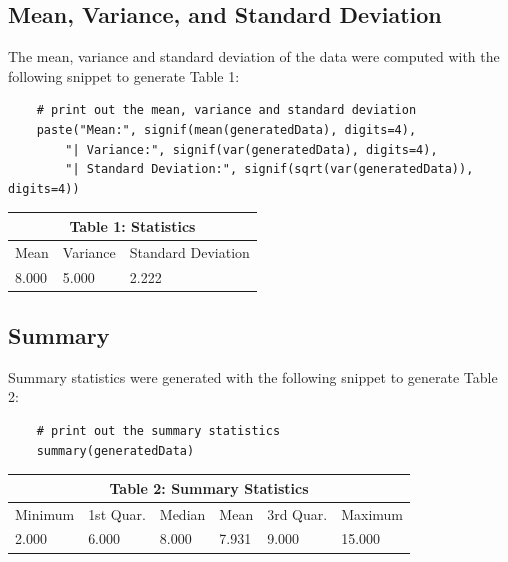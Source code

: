 \documentclass{article}
\begin{document}
        \subsection{Mean, Variance, and Standard Deviation}
            The mean, variance and standard deviation of the data were computed with the following snippet to generate Table 1:
\begin{lstlisting}
    # print out the mean, variance and standard deviation
    paste("Mean:", signif(mean(generatedData), digits=4),
        "| Variance:", signif(var(generatedData), digits=4),
        "| Standard Deviation:", signif(sqrt(var(generatedData)), digits=4))
\end{lstlisting}

        \renewcommand{\arraystretch}{1.5}
        \setlength{\tabcolsep}{18pt}
        \begin{table}[h!]
            \centering
            \begin{tabular}{|p{3cm}|p{3cm}|p{3cm}|}
                 \hline
                 \multicolumn{3}{|c|}{Table 1: Statistics} \\
                 \hline
                 Mean & Variance & Standard Deviation\\
                 \hline
                 8.000 & 5.000 & 2.222\\
                 \hline
            \end{tabular}
        \end{table}

        \subsection{Summary}
            Summary statistics were generated with the following snippet to generate Table 2:
\begin{lstlisting}
    # print out the summary statistics
    summary(generatedData)
\end{lstlisting}

        \begin{table}[h!]
            \centering
            \begin{tabular}{|p{1.5cm}|p{1.5cm}|p{1.5cm}|p{1.5cm}|p{1.5cm}|p{1.5cm}|}
                 \hline
                 \multicolumn{6}{|c|}{Table 2: Summary Statistics} \\
                 \hline
                   Minimum & 1st Quar. &  Median & Mean & 3rd Quar. & Maximum \\
                 \hline
                 2.000 & 6.000 & 8.000 & 7.931 & 9.000 & 15.000\\
                 \hline
            \end{tabular}
        \end{table}
\end{document}
